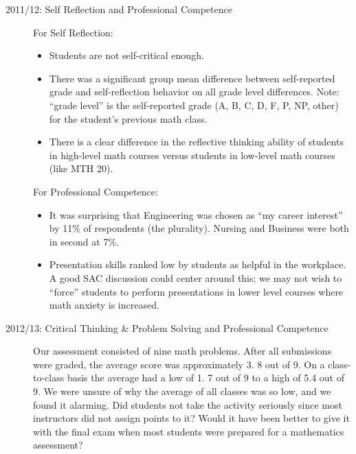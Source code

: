 \begin{description}

	\item[2011/12: Self Reflection and Professional Competence]
		For Self Reflection:
		\begin{itemize}
			\item Students are not self-critical enough.
			\item There was a significant group mean difference between self-reported grade
			      and self-reflection behavior on all grade level differences.
			      Note: ``grade level'' is the self-reported grade (A, B, C, D, F, P, NP, other) for the student's previous math class.
			\item There is a clear difference in the reflective thinking ability of students
			      in high-level math courses versus students in low-level math courses (like MTH
			      20).
		\end{itemize}
		For Professional Competence: \begin{itemize} \item It was surprising that Engineering was chosen as ``my career interest'' by 11\% of respondents (the plurality).
			      Nursing and Business were both in second at 7\%.
			\item Presentation skills ranked low by students as helpful in the workplace.
			      A good SAC discussion could center around this; we may not wish to ``force'' students to perform presentations in lower level courses where math anxiety is increased.
		\end{itemize}

	\item[2012/13:  Critical Thinking \& Problem Solving and Professional Competence]

		Our assessment consisted of nine math problems.
		After all submissions were graded, the average score was approximately 3.
		8 out of 9.
		On a class-to-class basis the average had a low of 1.
		7 out of 9 to a high of 5.4 out of 9.
		We were unsure of why the average of all classes was so low, and we found it alarming.
		Did students not take the activity seriously since most instructors did not assign points to it?
		Would it have been better to give it with the final exam when most students were prepared for a mathematics assessment?


\end{description}
